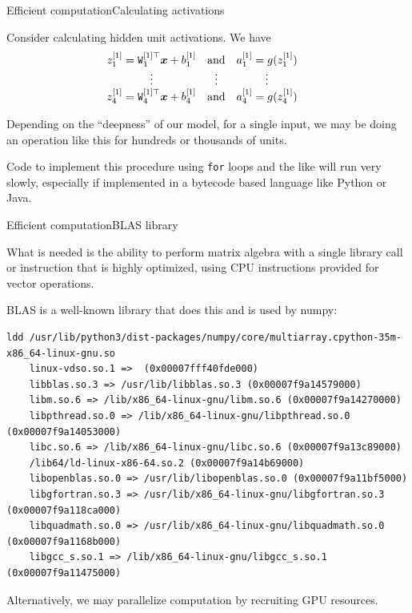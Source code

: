 \documentclass{beamer}
\renewcommand{\vec}[1]{\boldsymbol{#1}}
\newcommand{\mat}[1]{\mathtt{#1}}
\begin{document}
\begin{frame}{Efficient computation}{Calculating activations}

  Consider calculating hidden unit activations. We have
  $$\begin{matrix}
    z_1^{[1]} = \mat{W}_1^{[1]\top}\vec{x} + b_1^{[1]} & \text{and} & a_1^{[1]} = g(z_1^{[1]}) & \hfill \\
    \vdots & \vdots & \vdots & \hfill \\
    z_4^{[1]} = \mat{W}_4^{[1]\top}\vec{x} + b_4^{[1]} & \text{and} & a_4^{[1]} = g(z_4^{[1]}) & \hfill
  \end{matrix}$$

  Depending on the ``deepness'' of our model, for a single input, we
  may be doing an operation like this for hundreds or thousands of
  units.

  \medskip

  Code to implement this procedure using \texttt{for} loops and the
  like will run \alert{very slowly}, especially if implemented in a
  bytecode based language like Python or Java.

\end{frame}

  
\begin{frame}[fragile]{Efficient computation}{BLAS library}

  What is needed is the ability to perform matrix algebra with a
  single library call or instruction that is highly optimized, using
  CPU instructions provided for \alert{vector operations}.

  \medskip
  
  \alert{BLAS} is a well-known library that does this and is used by
  numpy:

\begin{tiny}
\begin{verbatim}
ldd /usr/lib/python3/dist-packages/numpy/core/multiarray.cpython-35m-x86_64-linux-gnu.so
	linux-vdso.so.1 =>  (0x00007fff40fde000)
	libblas.so.3 => /usr/lib/libblas.so.3 (0x00007f9a14579000)
	libm.so.6 => /lib/x86_64-linux-gnu/libm.so.6 (0x00007f9a14270000)
	libpthread.so.0 => /lib/x86_64-linux-gnu/libpthread.so.0 (0x00007f9a14053000)
	libc.so.6 => /lib/x86_64-linux-gnu/libc.so.6 (0x00007f9a13c89000)
	/lib64/ld-linux-x86-64.so.2 (0x00007f9a14b69000)
	libopenblas.so.0 => /usr/lib/libopenblas.so.0 (0x00007f9a11bf5000)
	libgfortran.so.3 => /usr/lib/x86_64-linux-gnu/libgfortran.so.3 (0x00007f9a118ca000)
	libquadmath.so.0 => /usr/lib/x86_64-linux-gnu/libquadmath.so.0 (0x00007f9a1168b000)
	libgcc_s.so.1 => /lib/x86_64-linux-gnu/libgcc_s.so.1 (0x00007f9a11475000)
\end{verbatim}
\end{tiny}

  \medskip

  Alternatively, we may parallelize computation by recruiting GPU resources.

\end{frame}
\end{document}

